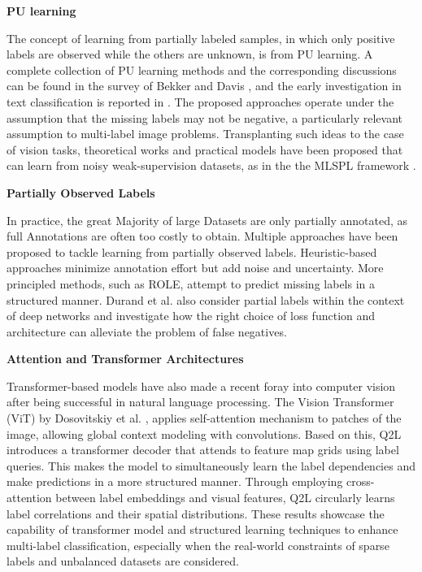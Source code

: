 \documentclass[lettersize,journal]{IEEEtran}
\renewcommand{\paragraph}[1]{%
  \vspace{1.5ex}\textbf{#1}\quad
}
\begin{document}
\paragraph{PU learning} 
The concept of learning from partially labeled samples, in which only positive labels are observed while the others are unknown, is from PU learning. A complete collection of PU learning methods and the corresponding discussions can be found in the survey of Bekker and Davis \cite{Bekker_2020}, and the early investigation in text classification is reported in \cite{Li_2003}. The proposed approaches operate under the assumption that the missing labels may not be negative, a particularly relevant assumption to multi-label image problems. Transplanting such ideas to the case of vision tasks, theoretical works and practical models have been proposed that can learn from noisy weak-supervision datasets, as in the the MLSPL framework \cite{mlsp}.


\paragraph{Partially Observed Labels}
In practice, the great Majority of large Datasets are only partially annotated, as full Annotations are often too costly to obtain. Multiple approaches have been proposed to tackle learning from partially observed labels. Heuristic-based approaches \cite{mlsp} minimize annotation effort but add noise and uncertainty. More principled methods, such as ROLE, attempt to predict missing labels in a structured manner. Durand et al. \cite{durand2019learningdeepconvnetmultilabel} also consider partial labels within the context of deep networks and investigate how the right choice of loss function and architecture can alleviate the problem of false negatives.


\paragraph{Attention and Transformer Architectures}
Transformer-based models have also made a recent foray into computer vision after being successful in natural language processing. The Vision Transformer (ViT) by Dosovitskiy et al. \cite{dosovitskiy2021imageworth16x16words}, applies self-attention mechanism to patches of the image, allowing global context modeling with convolutions. Based on this, Q2L \cite{Query2Label} introduces a transformer decoder that attends to feature map grids using label queries. This makes the model to simultaneously learn the label dependencies and make predictions in a more structured manner. Through employing cross-attention between label embeddings and visual features, Q2L circularly learns label correlations and their spatial distributions. These results showcase the capability of transformer model and structured learning techniques to enhance multi-label classification, especially when the real-world constraints of sparse labels and unbalanced datasets are considered.
\end{document}
